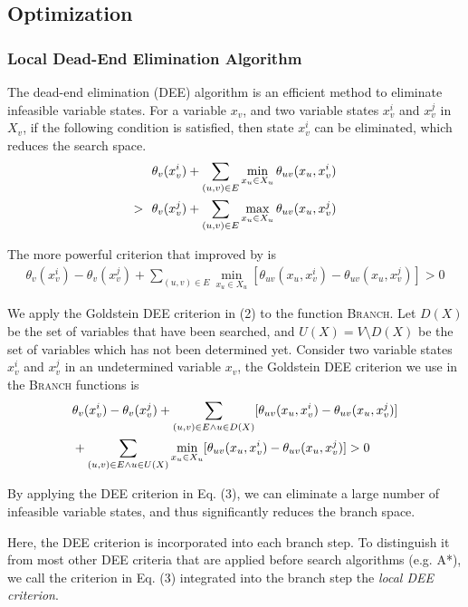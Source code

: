 \subsection{Optimization}

\subsubsection{Local Dead-End Elimination Algorithm}
The dead-end elimination (DEE) algorithm is an efficient method to eliminate infeasible variable states. For a variable $x_v$, and two variable states $x_v^i$ and $x_v^j$ in $X_v$, if the following condition is satisfied, then state $x_v^i$ can be eliminated, which reduces the search space.
\begin{align}
& \theta_v(x_v^i)+\sum_{(u,v)\in E}\min_{x_u\in X_u}\theta_{uv}(x_u,x_v^i) \notag \\
>\ \ & \theta_v(x_v^j)+\sum_{(u,v)\in E}\max_{x_u\in X_u}\theta_{uv}(x_u,x_v^j)
\end{align}

The more powerful criterion that improved by \cite{goldstein1994efficient} is
\begin{align}
\theta_v(x_v^i)-\theta_v(x_v^j)+\sum_{(u,v)\in E}\min_{x_u\in X_u}[\theta_{uv}(x_u,x_v^i)-\theta_{uv}(x_u,x_v^j)] > 0
\end{align}

We apply the Goldstein DEE criterion in (2) to the function \textsc{Branch}. Let $D(X)$ be the set of variables that have been searched, and $U(X)=V\setminus D(X)$ be the set of variables which has not been determined yet. Consider two variable states $x_v^i$ and $x_v^j$ in an undetermined variable $x_v$, the Goldstein DEE criterion we use in the \textsc{Branch} functions is
\begin{align}
& \theta_v(x_v^i)-\theta_v(x_v^j)+\sum_{(u,v)\in E\wedge u\in D(X)}[\theta_{uv}(x_u,x_v^i)-\theta_{uv}(x_u,x_v^j)] \notag \\
& +\sum_{(u,v)\in E\wedge u\in U(X)}\min_{x_u\in X_u}[\theta_{uv}(x_u,x_v^i)-\theta_{uv}(x_u,x_v^j)] > 0
\end{align}

By applying the DEE criterion in Eq. (3), we can eliminate a large number of infeasible variable states, and thus significantly reduces the branch space.

Here, the DEE criterion is incorporated into each branch step. To distinguish it from most other DEE criteria that are applied before search algorithms (e.g. A*\cite[]{gainza2013osprey}), we call the criterion in Eq. (3) integrated into the branch step the \textit{local DEE criterion}.

